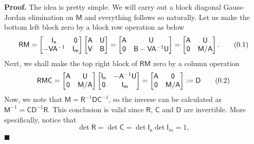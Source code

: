 \documentclass[10pt]{article}
\theoremstyle{definition}
\newenvironment{prf}{\noindent\textbf{Proof.}}{\hfill$\blacksquare$}
\newcommand\eqnum{\addtocounter{equation}{1}\tag{\arabic{section}.\arabic{equation}}}
\begin{document}
\begin{prf}
The idea is pretty simple. We will carry out a block diagonal Gauss-Jordan elimination on $\mathsf{M}$ and everything follows so naturally. Let us make the bottom left block zero by a block row operation as below
\begin{equation*}
\mathsf{R}\mathsf{M} =
\begin{bmatrix}
\mathsf{I_n} & \mathsf{0} \\
-\mathsf{V}\mathsf{A}^{-1} & \mathsf{I_m}
\end{bmatrix}
\begin{bmatrix}
\mathsf{A} & \mathsf{U} \\
\mathsf{V} & \mathsf{B}
\end{bmatrix} =
\begin{bmatrix}
\mathsf{A} & \mathsf{U} \\
\mathsf{0} & \mathsf{B}-\mathsf{V}\mathsf{A}^{-1}\mathsf{U}
\end{bmatrix} =
\begin{bmatrix}
\mathsf{A} & \mathsf{U} \\
\mathsf{0} & \mathsf{M}/\mathsf{A}
\end{bmatrix}.
\eqnum
\label{eq:inv:RM}
\end{equation*}
Next, we shall make the top right block of $\mathsf{R}\mathsf{M}$ zero by a column operation
\begin{equation*}
\mathsf{R}\mathsf{M}\mathsf{C} =
\begin{bmatrix}
\mathsf{A} & \mathsf{U} \\
\mathsf{0} & \mathsf{M}/\mathsf{A}
\end{bmatrix}
\begin{bmatrix}
\mathsf{I_n} & -\mathsf{A}^{-1}\mathsf{U} \\
\mathsf{0} & \mathsf{I_m}
\end{bmatrix} = 
\begin{bmatrix}
\mathsf{A} & \mathsf{0} \\
\mathsf{0} & \mathsf{M}/\mathsf{A}
\end{bmatrix} := \mathsf{D}
\eqnum
\label{eq:D:RMC}
\end{equation*}
Now, we note that $\mathsf{M} = \mathsf{R}^{-1}\mathsf{D}\mathsf{C}^{-1}$, so the inverse can be calculated as $\mathsf{M}^{-1} = \mathsf{C}\mathsf{D}^{-1}\mathsf{R}$. This conclusion is valid since $\mathsf{R}$, $\mathsf{C}$ and $\mathsf{D}$ are invertible. More specifically, notice that
\begin{equation}
\det\mathsf{R} = \det\mathsf{C} = \det\mathsf{I_n}\det\mathsf{I}_m = 1,

\end{equation}
\end{prf}
\end{document}
